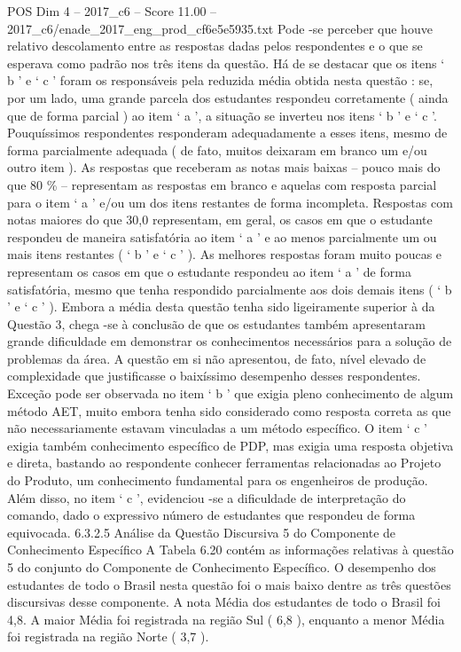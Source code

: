 \begin{textsample}{POS Dim 4 – 2017\_c6 – Score 11.00 – 2017\_c6/enade\_2017\_eng\_prod\_cf6e5e5935.txt}
Pode -se perceber que houve relativo descolamento entre as respostas dadas pelos respondentes e o que se esperava como padrão nos três itens da questão.
Há de se destacar que os itens ‘ b ’ e ‘ c ’ foram os responsáveis pela reduzida média obtida nesta questão : se, por um lado, uma grande parcela dos estudantes respondeu corretamente ( ainda que de forma parcial ) ao item ‘ a ’, a situação se inverteu nos itens ‘ b ’ e ‘ c ’.
Pouquíssimos respondentes responderam adequadamente a esses itens, mesmo de forma parcialmente adequada ( de fato, muitos deixaram em branco um e/ou outro item ).
As respostas que receberam as notas mais baixas – pouco mais do que 80 \% – representam as respostas em branco e aquelas com resposta parcial para o item ‘ a ’ e/ou um dos itens restantes de forma incompleta.
Respostas com notas maiores do que 30,0 representam, em geral, os casos em que o estudante respondeu de maneira satisfatória ao item ‘ a ’ e ao menos parcialmente um ou mais itens restantes ( ‘ b ’ e ‘ c ’ ).
As melhores respostas foram muito poucas e representam os casos em que o estudante respondeu ao item ‘ a ’ de forma satisfatória, mesmo que tenha respondido parcialmente aos dois demais itens ( ‘ b ’ e ‘ c ’ ).
Embora a média desta questão tenha sido ligeiramente superior à da Questão 3, chega -se à conclusão de que os estudantes também apresentaram grande dificuldade em demonstrar os conhecimentos necessários para a solução de problemas da área.
A questão em si não apresentou, de fato, nível elevado de complexidade que justificasse o baixíssimo desempenho desses respondentes.
Exceção pode ser observada no item ‘ b ’ que exigia pleno conhecimento de algum método AET, muito embora tenha sido considerado como resposta correta as que não necessariamente estavam vinculadas a um método específico.
O item ‘ c ’ exigia também conhecimento específico de PDP, mas exigia uma resposta objetiva e direta, bastando ao respondente conhecer ferramentas relacionadas ao Projeto do Produto, um conhecimento fundamental para os engenheiros de produção.
Além disso, no item ‘ c ’, evidenciou -se a dificuldade de interpretação do comando, dado o expressivo número de estudantes que respondeu de forma equivocada. 6.3.2.5 Análise da Questão Discursiva 5 do Componente de Conhecimento Específico A Tabela 6.20 contém as informações relativas à questão 5 do conjunto do Componente de Conhecimento Específico.
O desempenho dos estudantes de todo o Brasil nesta questão foi o mais baixo dentre as três questões discursivas desse componente.
A nota Média dos estudantes de todo o Brasil foi 4,8.
A maior Média foi registrada na região Sul ( 6,8 ), enquanto a menor Média foi registrada na região Norte ( 3,7 ).

\end{textsample}
